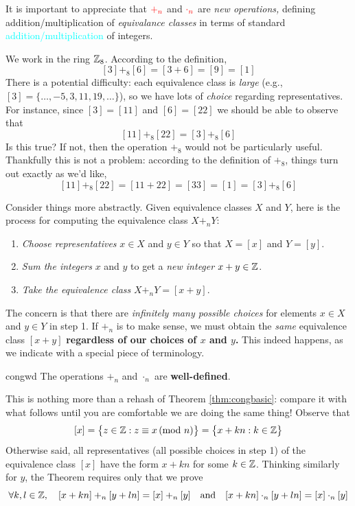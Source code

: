 It is important to appreciate that $\textcolor{red}{+_n}$ and $\textcolor{red}{\cdot_n}$ are \emph{new operations,} defining addition/multiplication of \emph{equivalance classes} in terms of standard \textcolor{cyan}{addition/multiplication} of integers.

\begin{example}{}{}
	We work in the ring $\mathbb{Z}_8$. According to the definition,
	\[
		[3]+_8[6]=[3+6]=[9]=[1]
	\]
	There is a potential difficulty: each equivalence class is \emph{large} (e.g., $[3]=\{\ldots,-5,3,11,19,\ldots\}$), so we have lots of \emph{choice} regarding representatives. For instance, since $[3]=[11]$ and $[6]=[22]$ we should be able to observe that
	\[
		[11]+_8[22] =[3]+_8[6]
	\]
	Is this true? If not, then the operation $+_8$ would not be particularly useful. Thankfully this is not a problem: according to the definition of $+_8$, things turn out exactly as we'd like,
	\[
		[11]+_8[22]=[11+22]=[33]=[1] =[3]+_8[6]
	\]
\end{example}


\goodbreak


Consider things more abstractly. Given equivalence classes $X$ and $Y$, here is the process for computing the equivalence class $X+_nY$:
\begin{enumerate}
  \item \emph{Choose representatives} $x\in X$ and $y\in Y$ so that $X=[x]$ and $Y=[y]$.
  \item \emph{Sum the integers} $x$ and $y$ to get a \emph{new integer} $x+y\in\mathbb{Z}$.
  \item \emph{Take the equivalence class} $X+_nY=[x+y]$.
\end{enumerate}
The concern is that there are \emph{infinitely many possible choices} for elements $x\in X$ and $y\in Y$ in step 1. If $+_n$ is to make sense, we must obtain the \emph{same} equivalence class $[x+y]$ {\bf regardless of our choices of $x$ and $y$.} This indeed happens, as we indicate with a special piece of terminology.


\begin{thm}{}{congwd}
	The operations $+_n$ and $\cdot_n$ are \textbf{well-defined}.
\end{thm}

This is nothing more than a rehash of Theorem \ref{thm:congbasic}: compare it with what follows until you are comfortable we are doing the same thing! Observe that
\[
	[x]=\bigl\{z\in\mathbb{Z}:z\equiv x\negthickspace\pmod{n}\bigr\} =\bigl\{x+kn:k\in\mathbb{Z}\bigr\}
\]
Otherwise said, all representatives (all possible choices in step 1) of the equivalence class $[x]$ have the form $x+kn$ for some $k\in\mathbb{Z}$. Thinking similarly for $y$, the Theorem requires only that we prove
\[
	\forall k,l\in\mathbb{Z},\quad [x+kn]+_n[y+ln]=[x]+_n[y]\quad\text{and}\quad [x+kn]\cdot_n[y+ln]=[x]\cdot_n[y]
\]

